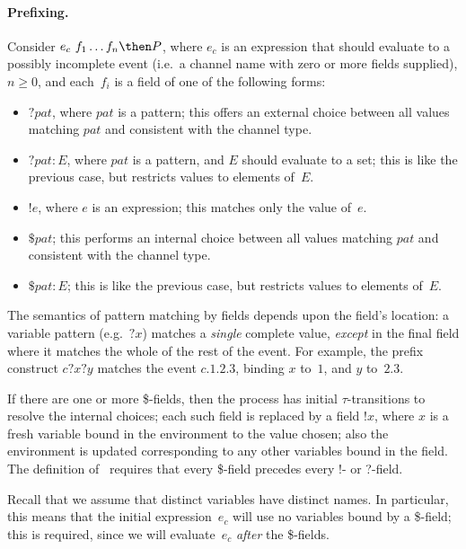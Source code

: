 
\paragraph{Prefixing.}  Consider $e_c ~ f_1 \ldots f_n \then P$, where $e_c$
is an expression that should evaluate to a possibly incomplete event (i.e.~a
channel name with zero or more fields supplied), $n \ge 0$, and each~$f_i$ is
a field of one of the following forms:
  \begin{itemize}
  \item $? pat$, where $pat$ is a pattern; this offers an external choice
    between all values matching $pat$ and consistent with the channel type. 

  \item $?pat : E$, where $pat$ is a pattern, and $E$ should evaluate to a
    set; this is like the previous case, but restricts values to elements
    of~$E$. 

  \item $!e$, where $e$ is an expression; this matches only the value of~$e$. 

  \item $\$ pat$; this performs an internal choice between all values matching
    $pat$ and consistent with the channel type.
 
  \item $\$ pat : E$; this is like the previous case, but restricts values to
    elements of~$E$.
  \end{itemize}
  The semantics of pattern matching by fields depends upon the field's
  location: a variable pattern (e.g.~$?x$) matches a \emph{single} complete
  value, \emph{except} in the final field where it matches the whole of the
  rest of the event.  For example, the prefix construct $c?x?y$ matches the
  event $c.1.2.3$, binding $x$ to~$1$, and $y$ to~$2.3$.

  If there are one or more \$-fields, then the process has initial
  $\tau$-transitions to resolve the internal choices; each such field is
  replaced by a field $!x$, where $x$ is a fresh variable bound in the
  environment to the value chosen; also the environment is updated
  corresponding to any other variables bound in the field.  The definition of
  \CSPm\ requires that every \$-field precedes every !- or ?-field.

  Recall that we assume that distinct variables have distinct names.  In
  particular, this means that the initial expression~$e_c$ will use no
  variables bound by a \$-field; this is required, since we will
  evaluate~$e_c$ \emph{after} the \$-fields. 

